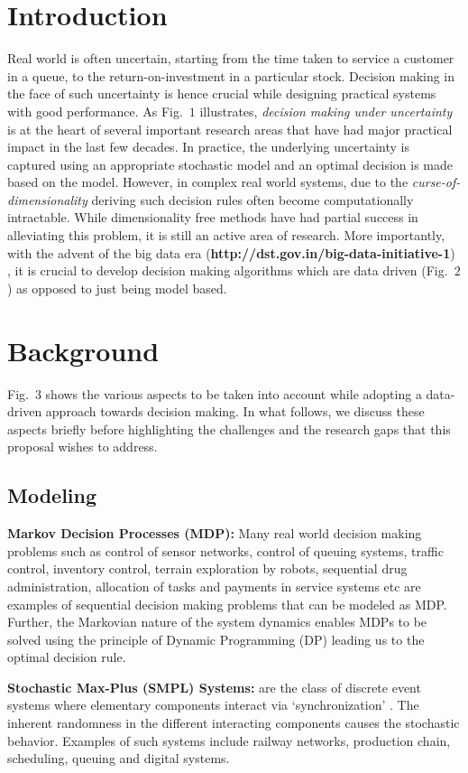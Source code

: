 
\usepackage{caption}

\maketitle
%
\section{Introduction}
Real world is often uncertain, starting from the time taken to service a customer in a queue, to the return-on-investment in a particular stock. Decision making in the face of such uncertainty is hence crucial while designing practical systems with good performance. As Fig.~$1$ illustrates, \emph{decision making under uncertainty} is at the heart of several important research areas that have had major practical impact in the last few decades. In practice, the underlying uncertainty is captured using an appropriate stochastic model and an optimal decision is made based on the model. However, in complex real world systems, due to the \emph{curse-of-dimensionality} deriving such decision rules often become computationally intractable. While dimensionality free methods \cite{dpchapter} have had partial success in alleviating this problem, it is still an active area of research. More importantly, with the advent of the big data era (\textbf{http://dst.gov.in/big-data-initiative-1}) , it is crucial to develop decision making algorithms which are data driven (Fig.~$2$) as opposed to just being model based.

\section{Background}
Fig.~$3$ shows the various aspects to be taken into account while adopting a data-driven approach towards decision making. In what follows, we discuss these aspects briefly before highlighting the challenges and the research gaps that this proposal wishes to address.
\FloatBarrier

\subsection{Modeling}
\textbf{Markov Decision Processes (MDP):}  Many real world decision making problems such as control of sensor networks, control of queuing systems, traffic control, inventory control, terrain exploration by robots, sequential drug administration, allocation of tasks and payments in service systems etc are examples of sequential decision making problems that can be modeled as MDP. Further, the Markovian nature of the system dynamics enables MDPs to be solved using the principle of Dynamic Programming (DP) leading us to the optimal decision rule.\par
\textbf{Stochastic Max-Plus (SMPL) Systems:}  are the class of discrete event systems where elementary components interact via `synchronization' \cite{smpl}. The inherent randomness in the different interacting components causes the stochastic behavior. Examples of such systems include railway networks, production chain, scheduling, queuing and digital systems. \par
